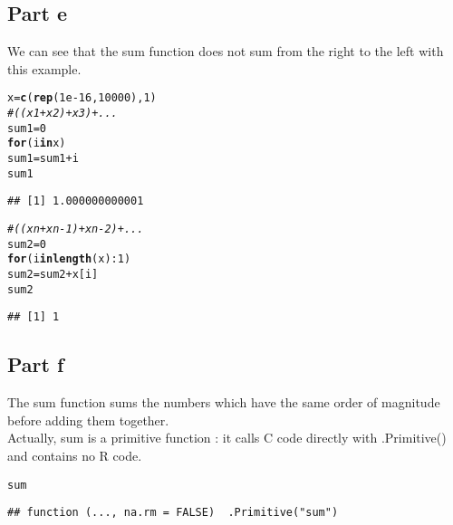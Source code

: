 \documentclass{llncs}\usepackage[]{graphicx}\usepackage[]{color}
\makeatletter
\newcommand{\hlnum}[1]{\textcolor[rgb]{0.686,0.059,0.569}{#1}}%
\newcommand{\hlcom}[1]{\textcolor[rgb]{0.678,0.584,0.686}{\textit{#1}}}%
\newcommand{\hlopt}[1]{\textcolor[rgb]{0,0,0}{#1}}%
\newcommand{\hlstd}[1]{\textcolor[rgb]{0.345,0.345,0.345}{#1}}%
\newcommand{\hlkwa}[1]{\textcolor[rgb]{0.161,0.373,0.58}{\textbf{#1}}}%
\newcommand{\hlkwb}[1]{\textcolor[rgb]{0.69,0.353,0.396}{#1}}%
\newcommand{\hlkwd}[1]{\textcolor[rgb]{0.737,0.353,0.396}{\textbf{#1}}}%
\newenvironment{kframe}{%
 \def\at@end@of@kframe{}%
 \ifinner\ifhmode%
  \def\at@end@of@kframe{\end{minipage}}%
  \begin{minipage}{\columnwidth}%
 \fi\fi%
 \def\FrameCommand##1{\hskip\@totalleftmargin \hskip-\fboxsep
 \colorbox{shadecolor}{##1}\hskip-\fboxsep
     \hskip-\linewidth \hskip-\@totalleftmargin \hskip\columnwidth}%
 \MakeFramed {\advance\hsize-\width
   \@totalleftmargin\z@ \linewidth\hsize
   \@setminipage}}%
 {\par\unskip\endMakeFramed%
 \at@end@of@kframe}
\newenvironment{knitrout}{}{} %
\makeatother
\begin{document}
\subsection{Part e}
We can see that the sum function does not sum from the right to the left with this example.
\begin{knitrout}
\color{fgcolor}\begin{kframe}
\begin{alltt}
\hlstd{x} \hlkwb{=} \hlkwd{c}\hlstd{(}\hlkwd{rep}\hlstd{(}\hlnum{1e-16}\hlstd{,}\hlnum{10000}\hlstd{),}\hlnum{1}\hlstd{)}
\hlcom{# ((x1 + x2) + x3) + ...}
\hlstd{sum1}\hlkwb{=}\hlnum{0}
\hlkwa{for} \hlstd{(i} \hlkwa{in} \hlstd{x)}
  \hlstd{sum1}\hlkwb{=}\hlstd{sum1}\hlopt{+}\hlstd{i}
\hlstd{sum1}
\end{alltt}
\begin{lstlisting}[basicstyle=\ttfamily,breaklines=true]
## [1] 1.000000000001
\end{lstlisting}
\begin{alltt}
\hlcom{# ((xn + xn-1) + xn-2) + ...}
\hlstd{sum2}\hlkwb{=}\hlnum{0}
\hlkwa{for} \hlstd{(i} \hlkwa{in} \hlkwd{length}\hlstd{(x)}\hlopt{:}\hlnum{1}\hlstd{)}
  \hlstd{sum2}\hlkwb{=}\hlstd{sum2}\hlopt{+}\hlstd{x[i]}
\hlstd{sum2}
\end{alltt}
\begin{lstlisting}[basicstyle=\ttfamily,breaklines=true]
## [1] 1
\end{lstlisting}
\end{kframe}
\end{knitrout}
\subsection{Part f}
The sum function sums the numbers which have the same order of magnitude before adding them together.\\
Actually, sum is a primitive function : it calls C code directly with .Primitive() and contains no R code.
\begin{knitrout}
\color{fgcolor}\begin{kframe}
\begin{alltt}
\hlstd{sum}
\end{alltt}
\begin{lstlisting}[basicstyle=\ttfamily,breaklines=true]
## function (..., na.rm = FALSE)  .Primitive("sum")
\end{lstlisting}
\end{kframe}
\end{knitrout}
\end{document}
